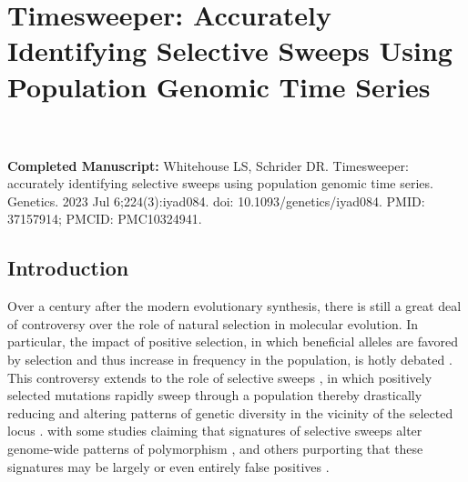 \chapter{Timesweeper: Accurately Identifying Selective Sweeps Using Population Genomic Time Series}
\\
\\
\textbf{Completed Manuscript:} Whitehouse LS, Schrider DR. Timesweeper: accurately identifying selective sweeps using population genomic time series. Genetics. 2023 Jul 6;224(3):iyad084. doi: 10.1093/genetics/iyad084. PMID: 37157914; PMCID: PMC10324941.

\section{Introduction}

Over a century after the modern evolutionary synthesis, there is still a great deal of controversy over the role of natural selection in molecular evolution. In particular, the impact of positive selection, in which beneficial alleles are favored by selection and thus increase in frequency in the population, is hotly debated \cite{hahnSelectionTheoryMolecular2008,jensenImportanceNeutralTheory2019,kernNeutralTheoryLight2018}. This controversy extends to the role of selective sweeps \cite{stephanGeneticHitchhikingBackground2010}, in which positively selected mutations rapidly sweep through a population thereby drastically reducing and altering patterns of genetic diversity in the vicinity of the selected locus \cite{kaplanHitchhikingEffectRevisited1989,smithHitchhikingEffectFavourable1974}. with some studies claiming that signatures of selective sweeps alter genome-wide patterns of polymorphism \cite{bookerSelectiveSweepsInfluence2021,enardGenomewideSignalsPositive2014,garudRecentSelectiveSweeps2015,garudElevatedLinkageDisequilibrium2016,schriderSoftSweepsAre2017}, and others purporting that these signatures may be largely or even entirely false positives \cite{harrisUnfoundedEnthusiasmSoft2018}.

